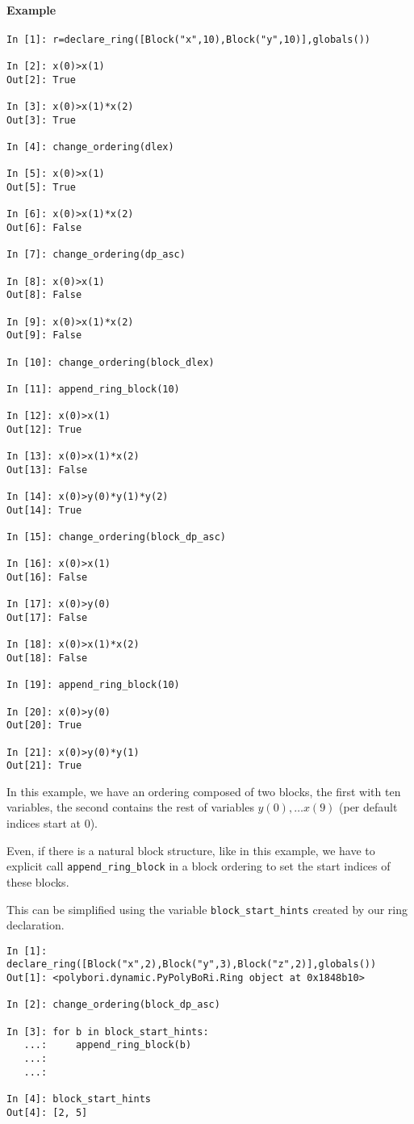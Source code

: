 \documentclass[]{article}
\begin{document}
\paragraph{Example}
\begin{verbatim}
In [1]: r=declare_ring([Block("x",10),Block("y",10)],globals())

In [2]: x(0)>x(1)
Out[2]: True

In [3]: x(0)>x(1)*x(2)
Out[3]: True

In [4]: change_ordering(dlex)

In [5]: x(0)>x(1)
Out[5]: True

In [6]: x(0)>x(1)*x(2)
Out[6]: False

In [7]: change_ordering(dp_asc)

In [8]: x(0)>x(1)
Out[8]: False

In [9]: x(0)>x(1)*x(2)
Out[9]: False

In [10]: change_ordering(block_dlex)

In [11]: append_ring_block(10)

In [12]: x(0)>x(1)
Out[12]: True

In [13]: x(0)>x(1)*x(2)
Out[13]: False

In [14]: x(0)>y(0)*y(1)*y(2)
Out[14]: True

In [15]: change_ordering(block_dp_asc)

In [16]: x(0)>x(1)
Out[16]: False

In [17]: x(0)>y(0)
Out[17]: False

In [18]: x(0)>x(1)*x(2)
Out[18]: False

In [19]: append_ring_block(10)

In [20]: x(0)>y(0)
Out[20]: True

In [21]: x(0)>y(0)*y(1)
Out[21]: True
\end{verbatim}
In this example, we have an ordering composed of two blocks, the first with ten variables, the second contains the rest of variables $y(0), \ldots x(9)$ (per default indices start at 0).

Even, if there is a natural block structure, like in this example, we have to explicit call \verb|append_ring_block| in a block ordering to set the start indices of these blocks.

This can be simplified using the variable \verb|block_start_hints| created by our ring declaration.

\begin{verbatim}
In [1]: declare_ring([Block("x",2),Block("y",3),Block("z",2)],globals())
Out[1]: <polybori.dynamic.PyPolyBoRi.Ring object at 0x1848b10>

In [2]: change_ordering(block_dp_asc)

In [3]: for b in block_start_hints:
   ...:     append_ring_block(b)
   ...:     
   ...:     

In [4]: block_start_hints
Out[4]: [2, 5]
\end{verbatim}
\end{document}
